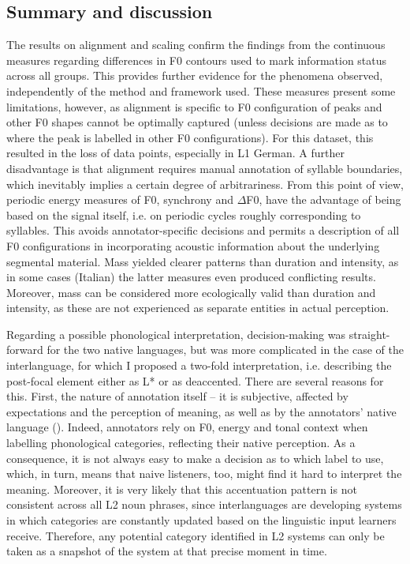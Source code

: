 \subsection{Summary and discussion}
\label{sec:2.8.5}
The results on alignment and scaling confirm the findings from the continuous measures regarding differences in F0 contours used to mark information status across all groups. This provides further evidence for the phenomena observed, independently of the method and framework used. These measures present some limitations, however, as alignment is specific to F0 configuration of peaks and other F0 shapes cannot be optimally captured (unless decisions are made as to where the peak is labelled in other F0 configurations). For this dataset, this resulted in the loss of data points, especially in L1 German. A further disadvantage is that alignment requires manual annotation of syllable boundaries, which inevitably implies a certain degree of arbitrariness. From this point of view, periodic energy measures of F0, synchrony and ${\Delta}$F0, have the advantage of being based on the signal itself, i.e. on periodic cycles roughly corresponding to syllables. This avoids annotator-specific decisions and permits a description of all F0 configurations in incorporating acoustic information about the underlying segmental material. Mass yielded clearer patterns than duration and intensity, as in some cases (Italian) the latter measures even produced conflicting results. Moreover, mass can be considered more ecologically valid than duration and intensity, as these are not experienced as separate entities in actual perception.

\hspace*{-3pt}Regarding a possible phonological interpretation, decision-making was straight-forward for the two native languages, but was more complicated in the case of the interlanguage, for which I proposed a two-fold interpretation, i.e. describing the post-focal element either as L* or as deaccented. There are several reasons for this. First, the nature of annotation itself – it is subjective, affected by expectations and the perception of meaning, as well as by the annotators’ native language (\citealt{CangemiGrice2016}). Indeed, annotators rely on F0, energy and tonal context when labelling phonological categories, reflecting their native perception. As a consequence, it is not always easy to make a decision as to which label to use, which, in turn, means that naive listeners, too, might find it hard to interpret the meaning. Moreover, it is very likely that this accentuation pattern is not consistent across all L2 noun phrases, since interlanguages are developing systems in which categories are constantly updated based on the linguistic input learners receive. Therefore, any potential category identified in L2 systems can only be taken as a snapshot of the system at that precise moment in time.


